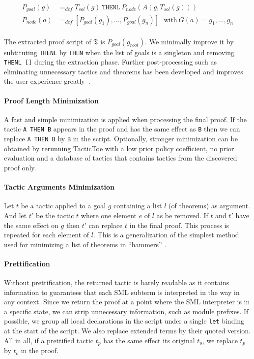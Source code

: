 \documentclass[runningheads,a4paper,draft]{svjour3}
\def\sml{\textsf{SML}\xspace}
\def\tactictoe{\textsf{TacticToe}\xspace}
\begin{document}
\begin{align*}
P_{goal}(g) &=_{def} T_{sol}(g)\ \texttt{THENL}\ P_{node}(A(g,T_{sol}(g)))\\
P_{node}(a) &=_{def} [P_{goal}(g_1),\ldots,P_{goal}(g_n)]\ \ \ \text{with}\
G(a) = g_1,\ldots,g_n\\
\end{align*}

The extracted proof script of $\mathfrak{T}$ is $P_{goal}(g_{root})$.
We minimally improve it by subtituting \texttt{THENL} by \texttt{THEN} when the
list of goals is a singleton and removing \texttt{THENL []} during the
extraction phase.
Further post-processing such as
eliminating unnecessary tactics and theorems has been developed and
improves the user experience greatly~\cite{DBLP:conf/sefm/Adams15}.

\paragraph{Proof Length Minimization}
A fast and simple minimization is applied when processing the final proof. If
the tactic \texttt{A THEN B} appears in the proof and has the same effect as
\texttt{B} then we can replace \texttt{A THEN B} by \texttt{B} in the script.
Optionally, stronger minimization can be obtained
by rerunning \tactictoe with a low prior
policy coefficient, no prior evaluation and a database of tactics that contains
tactics from the discovered proof only.

\paragraph{Tactic Arguments Minimization}
Let $t$ be a tactic applied to a goal $g$ containing a list $l$ (of theorems)
as argument. And let $t'$ be the tactic $t$ where one element $e$ of $l$ as be
removed. If $t$ and $t'$ have the same effect on $g$ then $t'$ can replace $t$
in the final proof. This process is repeated for each element of $l$.
This is a generalization of the simplest method used for minimizing a list of
theorems in ``hammers'' \cite{hammers4qed}.

\paragraph{Prettification}
Without prettification, the returned tactic is barely readable as it contains
information to guarantees that each \sml subterm is interpreted in the way in
any context. Since we return the proof at a point where the \sml interpreter is
in a specific state, we can strip unnecessary information, such as
module prefixes. If possible, we group all local declarations in the
script under a single \texttt{let} binding at the start of the script. We
also replace extended terms by their quoted version.
All in all, if a prettified tactic $t_p$ has the same effect its original
$t_o$, we replace $t_p$ by $t_o$ in the proof.\\
\end{document}
